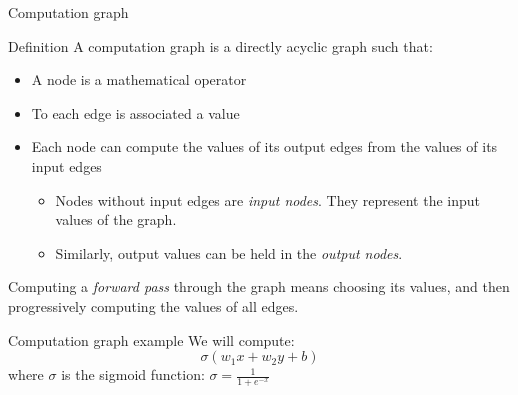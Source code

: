\documentclass[xcolor=pdftex,dvipsnames,table,mathserif]{beamer}
\begin{document}
\begin{frame}{Computation graph}

\begin{block}{Definition}
  A computation graph is a directly acyclic graph such that:
  \begin{itemize}
  \item A node is a mathematical operator
  \item To each edge is associated a value
  \item Each node can compute the values of its output edges from the values of its input edges
    \begin{itemize}
    \item Nodes without input edges are \emph{input nodes}. They represent the input values of the graph.
    \item Similarly, output values can be held in the \emph{output nodes}.
    \end{itemize}
  \end{itemize}
\end{block}

Computing a \emph{forward pass} through the graph means choosing its values, and then progressively computing the values of all edges.


\end{frame}


\begin{frame}{Computation graph example}
We will compute:
  \[
  \sigma(w_1x + w_2y + b)
  \]
  where $\sigma$ is the sigmoid function: $\sigma = \frac{1}{1 + e^{-x}}$

\end{frame}

\end{document}
